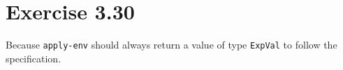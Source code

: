 \section{Exercise 3.30}

Because \texttt{apply-env} should always return a value of type
\texttt{ExpVal} to follow the specification.
